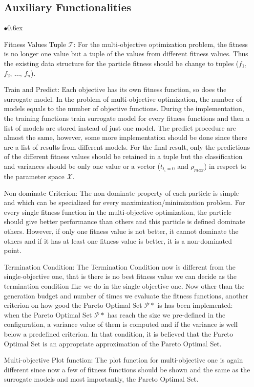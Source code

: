 \documentclass[11pt, runningheads,a4paper]{llncs}
\begin{document}
\subsection{Auxiliary Functionalities}
\begin{list}{$\bullet$}{\itemsep 0.6ex}
\item Fitness Values Tuple $\mathcal{T}$: For the multi-objective optimization problem, the fitness is no longer one value but a tuple of the values from different fitness values. Thus the existing data structure for the particle fitness should be change to tuples ($f_1$, $f_2$, $\dots$, $f_n$).

\item Train and Predict: Each objective has its own fitness function, so does the surrogate model. In the problem of multi-objective optimization, the number of models equals to the number of objective functions. During the implementation, the training functions train surrogate model for every fitness functions and then a list of models are stored instead of just one model. The predict procedure are almost the same, however, some more implementation should be done since there are a list of results from different models. For the final result, only the predictions of the different fitness values should be retained in a tuple but the classification and variances should be only one value or a vector ($t_{t_i = 0}$ and $\rho_{max} $) in respect to the parameter space  $\mathcal{X}$. 

\item Non-dominate Criterion: The non-dominate property of each particle is simple and which can be specialized for every maximization/minimization problem. For every single fitness function in the multi-objective optimization, the particle should give better performance than others and this particle is defined dominate others. However, if only one fitness value is not better, it cannot dominate the others and if it has at least one fitness value is better, it is a non-dominated point.

\item Termination Condition: The Termination Condition now is different from the single-objective one, that is there is no best fitness value we can decide as the termination condition like we do in the single objective one. Now other than the generation budget and number of times we evaluate the fitness functions, another criterion on how good the Pareto Optimal Set  $\mathcal{P}*$ is has been implemented: when the Pareto Optimal Set  $\mathcal{P}*$ has reach the size we pre-defined in the configuration, a variance value of them is computed and if the variance is well below a predefined criterion. In that condition, it is believed that the Pareto Optimal Set is an appropriate approximation of the Pareto Optimal Set.


\item Multi-objective Plot function: The plot function for multi-objective one is again different since now a few of fitness functions should be shown and the same as the surrogate models and most importantly, the Pareto Optimal Set. 

\end{list}
\end{document}
